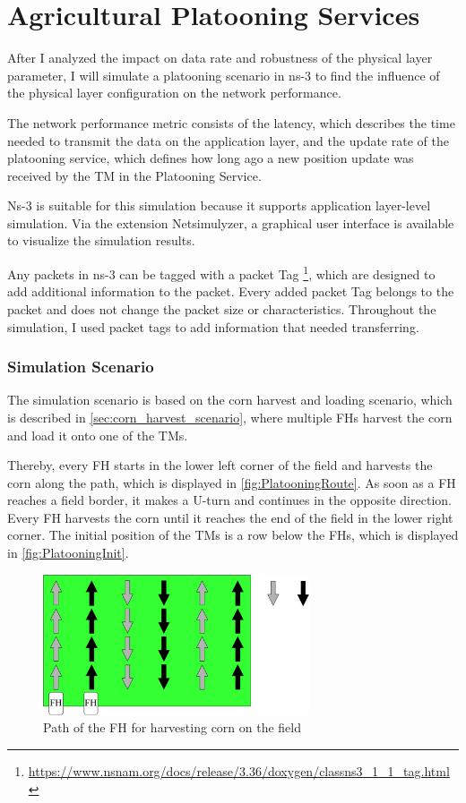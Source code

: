 \section{Agricultural Platooning Services}

After I analyzed the impact on data rate and robustness of the physical layer parameter, I will simulate a platooning scenario in ns-3 to find the influence of the physical layer configuration on the network performance.


The network performance metric consists of the latency, which describes the time needed to transmit the data
on the application layer, and the update rate of the platooning service, which defines how long ago a new position update
was received by the \ac{TM} in the Platooning Service.

Ns-3 is suitable for this simulation because it supports application layer-level simulation.
Via the extension Netsimulyzer, a graphical user interface is available to visualize the simulation results.

Any packets in ns-3 can be tagged with a packet Tag \footnote{\url{https://www.nsnam.org/docs/release/3.36/doxygen/classns3_1_1_tag.html}},
which are designed to add additional information to the packet.
Every added packet Tag belongs to the packet and does not change the packet size or characteristics.
Throughout the simulation, I used packet tags to add information that needed transferring.

\subsubsection*{Simulation Scenario}
The simulation scenario is based on the corn harvest and loading scenario, which is described in \autoref{sec:corn_harvest_scenario}, where
multiple \ac{FH}s harvest the corn and load it onto one of the \ac{TM}s.

Thereby, every \ac{FH} starts in the lower left corner of the field and harvests the corn along the path,
which is displayed in \autoref{fig:PlatooningRoute}.
As soon as a \ac{FH} reaches a field border, it makes a U-turn and continues
in the opposite direction.
Every \ac{FH} harvests the corn until it reaches the end of the field in the lower right corner.
The initial position of the \ac{TM}s is a row below the \ac{FH}s, which is displayed in \autoref{fig:PlatooningInit}.
\begin{figure}[H]%
   \centering
   \includegraphics[width=0.7\textwidth]{figures/drawings-Route}
   \caption{Path of the \acf{FH} for harvesting corn on the field}
   \label{fig:PlatooningRoute}%
\end{figure}

